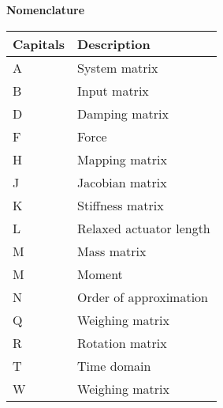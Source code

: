 \begin{spacing}{0.9}

\Large{\textbf{Nomenclature}}

\begin{multicols}{2}
\begin{table}[H]
\centering
    \begin{tabular}{p{1.7cm} p{4.8cm}} \hline
    \textbf{Capitals}    &   \textbf{Description }\\ \hline
    A      &  System matrix \\
    B     &  Input matrix \\
    D     &  Damping matrix \\
    F     & Force \\
    H     &  Mapping matrix \\
    J     &  Jacobian matrix \\
    K     &  Stiffness matrix \\
    L     &  Relaxed actuator length \\
    M     &  Mass matrix \\
    M     &  Moment \\
    N     & Order of approximation \\
    Q     & Weighing matrix \\
    R     & Rotation matrix \\
    T     & Time domain \\
    W     & Weighing matrix \\ \hline
    \end{tabular}
\end{table}





\end{multicols}
\end{spacing}
